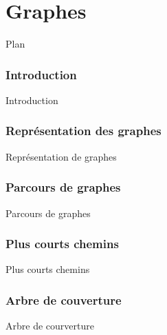 \part{Graphes}



\begin{frame}{Plan}

\tableofcontents

\end{frame}


\section{Introduction}

\begin{frame}{Introduction}
\end{frame}

\section{Représentation des graphes}

\begin{frame}{Représentation de graphes}
\end{frame}

\section{Parcours de graphes}

\begin{frame}{Parcours de graphes}
\end{frame}

\section{Plus courts chemins}

\begin{frame}{Plus courts chemins}
\end{frame}

\section{Arbre de couverture}

\begin{frame}{Arbre de courverture}
\end{frame}

